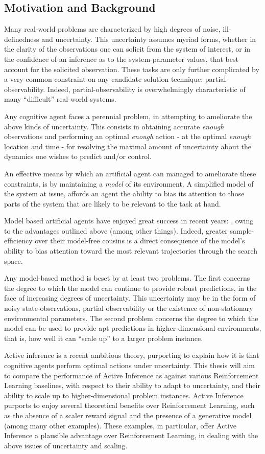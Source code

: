 \documentclass[12pt, oneside]{article}
\begin{document}
\subsection{Motivation and Background}
Many real-world problems are characterized by high degrees of noise, ill-definedness and uncertainty. This uncertainty assumes myriad forms, whether in the clarity of the observations one can solicit from the system of interest, or in the confidence of an inference as to the system-parameter values, that best account for the solicited observation. These tasks are only further complicated by a very common constraint on any candidate solution technique: partial-observability. Indeed, partial-observability is overwhelmingly characteristic of many ``difficult'' real-world systems. 

Any cognitive agent faces a perennial problem, in attempting to ameliorate the above kinds of uncertainty. This consists in obtaining accurate \textit{enough} observations and performing an optimal \textit{enough} action - at the optimal \textit{enough} location and time - for resolving the maximal amount of uncertainty about the dynamics one wishes to predict and/or control.  

An effective means by which an artificial agent can managed to ameliorate these constraints, is by maintaining a \textit{model} of its environment. A simplified model of the system at issue, affords an agent the ability to bias its attention to those parts of the system that are likely to be relevant to the task at hand. 

Model based artificial agents have enjoyed great success in recent years: \textcite{dream}, owing to the advantages outlined above (among other things). Indeed, greater sample-efficiency over their model-free cousins is a direct consequence of the model's ability to bias attention toward the most relevant trajectories through the search space.

Any model-based method is beset by at least two problems. The first concerns the degree to which the model can continue to provide robust predictions, in the face of increasing degrees of uncertainty. This uncertainty may be in the form of noisy state-observations, partial observability or the existence of non-stationary environmental parameters. The second problem concerns the degree to which the model can be used to provide apt predictions in higher-dimensional environments, that is, how well it can ``scale up'' to a larger problem instance. 

Active inference is a recent ambitious theory, purporting to explain how it is that cognitive agents perform optimal actions under uncertainty. This thesis will aim to compare the performance of Active Inference as against various Reinforcement Learning baselines, with respect to their ability to adapt to uncertainty, and their ability to scale up to higher-dimensional problem instances. Active Inference purports to enjoy several theoretical benefits over Reinforcement Learning, such as the absence of a scaler reward signal and the presence of a generative model (among many other examples). These examples, in particular, offer Active Inference a plausible advantage over Reinforcement Learning, in dealing with the above issues of uncertainty and scaling.  
\end{document}
